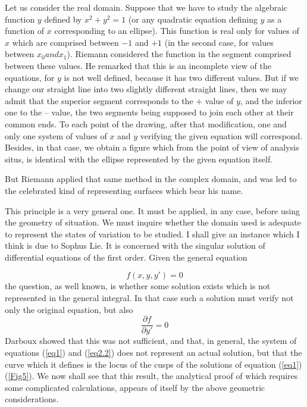 \documentclass[12pt,oneside]{book}
\begin{document}
Let us consider the real domain. Suppose that we have to study the algebraic
function $y$ defined by $x^2+y^2=1$ (or any quadratic equation defining $y$ as a
function of $x$ corresponding to an ellipse). This function is real only for
values of $x$ which are comprised between $-1$ and $+1$ (in the second case, for
values between $x_0 and x_1$). Riemann considered the function in the segment
comprised between these values. He remarked that this is an incomplete view of
the equations, for $y$ is not well defined, because it has two different values.
But if we change our straight line into two slightly different straight lines,
then we may admit that the superior segment corresponds to the $+$ value of $y$,
and the inferior one to the -- value, the two segments being supposed to join
each other at their common ends. To each point of the drawing, after that
modification, one and only one system of values of $x$ and $y$ verifying the
given equation will correspond. Besides, in that case, we obtain a figure which
from the point of view of analysis situs, is identical with the ellipse
represented by the given equation itself. \par

But Riemann applied that same method in the complex domain, and was led to the
celebrated kind of representing surfaces which bear his name. \par

This principle is a very general one. It must be applied, in any case, before
using the geometry of situation. We must inquire whether the domain used is
adequate to represent the states of variation to be studied. I shall give an
instance which I think is due to Sophus Lie. It is concerned with the singular
solution of differential equations of the first order. Given the general
equation

\begin{equation}
    f(x,y,y')=0
    \label{eq1}
\end{equation}
the question, as well known, is whether some solution exists which is not
represented in the general integral. In that case such a solution must verify
not only the original equation, but also
\begin{equation}
    \frac{\partial f}{\partial y'}=0
    \label{eq2.2}
\end{equation}
Darboux showed that this was not sufficient, and that, in general, the system of
equations (\ref{eq1}) and (\ref{eq2.2}) does not represent an actual solution,
but that the curve which it defines is the locus of the cusps of the solutions
of equation (\ref{eq1}) (\ref{Fig5}). We now shall see that this result, the
analytical proof of which requires some complicated calculations, appears of
itself by the above geometric considerations. \par
\end{document}
